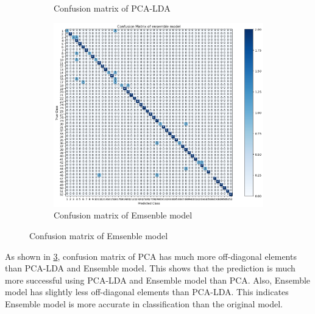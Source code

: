 \begin{figure}[htbp]
\begin{subfigure}[t]{0.3\linewidth}
	\caption{Confusion matrix of PCA-LDA}
	\label{fig:q3_1_cm}
        \end{subfigure}
    \quad
        \begin{subfigure}[t]{0.3\linewidth}
        \centering
        \includegraphics[width=\linewidth]{image/q3_2_cm.png} %
	\caption{Confusion matrix of Emsenble model}
	\label{fig:q3_2_cm}
        \end{subfigure}
    \label{fig:cm}
\end{figure}

As shown in \cref{fig:cm}, confusion matrix of PCA has much more off-diagonal elements than PCA-LDA and Ensemble model. This shows that the prediction is much more successful using PCA-LDA and Ensemble model than PCA. Also, Ensemble model has slightly less off-diagonal elements than PCA-LDA. This indicates Ensemble model is more accurate in classification than the original model. 

\newpage
